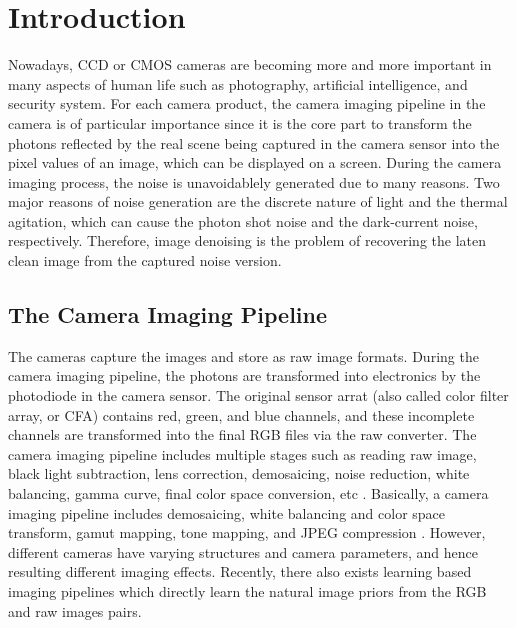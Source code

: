 %
\chapter{Introduction}
\label{sec:intro}



Nowadays, CCD or CMOS cameras are becoming more and more important in many aspects of human life such as photography, artificial intelligence, and security system. For each camera product, the camera imaging pipeline in the camera is of particular importance since it is the core part to transform the photons reflected by the real scene being captured in the camera sensor into the pixel values of an image, which can be displayed on a screen. During the camera imaging process, the noise is unavoidablely generated due to many reasons. Two major reasons of noise generation are the discrete nature of light and the thermal agitation, which can cause the photon shot noise and the dark-current noise, respectively. Therefore, image denoising is the problem of recovering the laten clean image from the captured noise version. 

\section{The Camera Imaging Pipeline}
\label{sec:intro:general}

The cameras capture the images and store as raw image formats. During the camera imaging pipeline, the photons are transformed into electronics by the photodiode in the camera sensor. The original sensor arrat (also called color filter array, or CFA) contains red, green, and blue channels, and these incomplete channels are transformed into the final RGB files via the raw converter. The camera imaging pipeline includes multiple stages such as reading raw image, black light subtraction, lens correction, demosaicing, noise reduction, white balancing, gamma curve, final color space conversion, etc \cite{browneccv2016}. Basically, a camera imaging pipeline includes demosaicing, white balancing and color space transform, gamut mapping, tone mapping, and JPEG compression \cite{crosschannel}. However, different cameras have varying structures and camera parameters, and hence resulting different imaging effects. Recently, there also exists learning based imaging pipelines which directly learn the  natural image priors from the RGB and raw images pairs.


